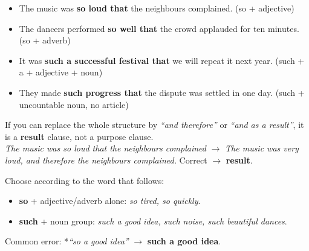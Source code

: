 \documentclass[11pt]{article}
\begin{document}
\begin{exemplebox}
\begin{itemize}
\item The music was \textbf{so loud that} the neighbours complained. (so + adjective)
\item The dancers performed \textbf{so well that} the crowd applauded for ten minutes. (so + adverb)
\item It was \textbf{such a successful festival that} we will repeat it next year. (such + a + adjective + noun)
\item They made \textbf{such progress that} the dispute was settled in one day. (such + uncountable noun, no article)
\end{itemize}
\end{exemplebox}

\begin{methode}
If you can replace the whole structure by \emph{``and therefore''} or \emph{``and as a result''}, it is a \textbf{result} clause, not a purpose clause.\\ \emph{The music was so loud that the neighbours complained} $\rightarrow$ \emph{The music was very loud, and therefore the neighbours complained.} Correct $\rightarrow$ \textbf{result}.
\end{methode}

\begin{attention}[so or such?]
Choose according to the word that follows:
\begin{itemize}
\item \textbf{so} + adjective/adverb alone: \emph{so tired, so quickly}.
\item \textbf{such} + noun group: \emph{such a good idea, such noise, such beautiful dances}.
\end{itemize}
Common error: *\emph{``so a good idea''} $\rightarrow$ \textbf{such a good idea}.
\end{attention}
\end{document}
